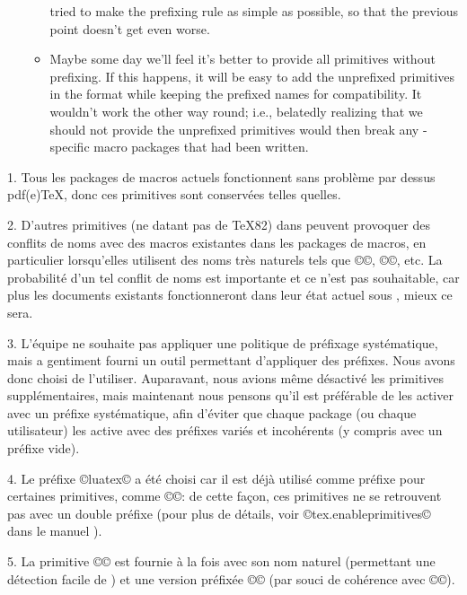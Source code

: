 \documentclass{lltxdoc}
\begin{document}
\begin{myquote}
\begin{enumerate}
\begin{itemize}
          tried to make the prefixing rule as simple as possible, so that
          the previous point doesn't get even worse.
        \item Maybe some day we'll feel it's better to provide all primitives
          without prefixing. If this happens, it will be easy to add the
          unprefixed primitives in the format while keeping the prefixed names
          for compatibility. It wouldn't work the other way round; i.e.,
          belatedly realizing that we should not provide the unprefixed
          primitives would then break any \luatex-specific macro packages
          that had been written.
      \end{itemize}
  \end{enumerate}
\end{myquote}

1. Tous les packages de macros actuels fonctionnent sans problème par dessus pdf(e)TeX, donc ces primitives sont conservées telles quelles.

2. D'autres primitives (ne datant pas de TeX82) dans \luatex peuvent provoquer des conflits de noms avec des macros existantes dans les packages de macros, en particulier lorsqu'elles utilisent des noms très \og{}naturels\fg{} tels que ©\outputbox©, ©\mathstyle©, etc. La probabilité d'un tel conflit de noms est importante et ce n'est pas souhaitable, car plus les documents \latex existants fonctionneront dans leur état actuel sous \luatex, mieux ce sera.

3. L'équipe \luatex ne souhaite pas appliquer une politique de préfixage systématique, mais a gentiment fourni un outil permettant d'appliquer des préfixes. Nous avons donc choisi de l'utiliser. Auparavant, nous avions même désactivé les primitives supplémentaires, mais maintenant nous pensons qu'il est préférable de les activer avec un préfixe systématique, afin d'éviter que chaque package (ou chaque utilisateur) les active avec des préfixes variés et incohérents (y compris avec un préfixe vide).

4. Le préfixe ©luatex© a été choisi car il est déjà utilisé comme préfixe pour certaines primitives, comme ©\luatexversion©: de cette façon, ces primitives ne se retrouvent pas avec un double préfixe (pour plus de détails, voir ©tex.enableprimitives© dans le manuel \luatex).

5. La primitive ©\directlua© est fournie à la fois avec son nom naturel (permettant une détection facile de \luatex) et une version préfixée ©\luatexdirectlua© (par souci de cohérence avec ©\luatexlatelua©).
\end{document}
